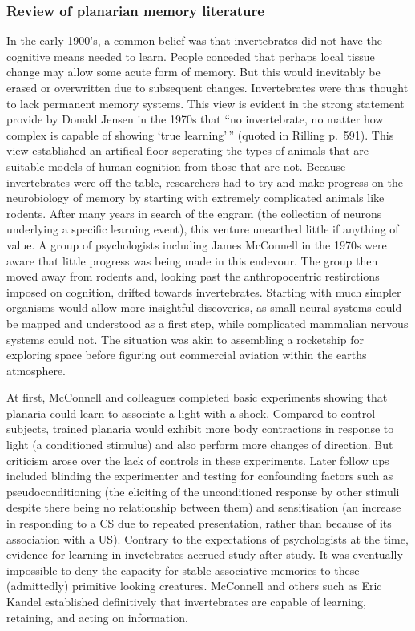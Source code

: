 \documentclass[
  letterpaper,
  DIV=11,
  numbers=noendperiod,
  oneside]{scrartcl}
\begin{document}
\subsubsection{Review of planarian memory
literature}\label{review-of-planarian-memory-literature}

In the early 1900's, a common belief was that invertebrates did not have
the cognitive means needed to learn. People conceded that perhaps local
tissue change may allow some acute form of memory. But this would
inevitably be erased or overwritten due to subsequent changes.
Invertebrates were thus thought to lack permanent memory systems. This
view is evident in the strong statement provide by Donald Jensen in the
1970s that ``no invertebrate, no matter how complex is capable of
showing `true learning'\,'' (quoted in Rilling p.~591). This view
established an artifical floor seperating the types of animals that are
suitable models of human cognition from those that are not. Because
invertebrates were off the table, researchers had to try and make
progress on the neurobiology of memory by starting with extremely
complicated animals like rodents. After many years in search of the
engram (the collection of neurons underlying a specific learning event),
this venture unearthed little if anything of value. A group of
psychologists including James McConnell in the 1970s were aware that
little progress was being made in this endevour. The group then moved
away from rodents and, looking past the anthropocentric restirctions
imposed on cognition, drifted towards invertebrates. Starting with much
simpler organisms would allow more insightful discoveries, as small
neural systems could be mapped and understood as a first step, while
complicated mammalian nervous systems could not. The situation was akin
to assembling a rocketship for exploring space before figuring out
commercial aviation within the earths atmosphere.

At first, McConnell and colleagues completed basic experiments showing
that planaria could learn to associate a light with a shock. Compared to
control subjects, trained planaria would exhibit more body contractions
in response to light (a conditioned stimulus) and also perform more
changes of direction. But criticism arose over the lack of controls in
these experiments. Later follow ups included blinding the experimenter
and testing for confounding factors such as pseudoconditioning (the
eliciting of the unconditioned response by other stimuli despite there
being no relationship between them) and sensitisation (an increase in
responding to a CS due to repeated presentation, rather than because of
its association with a US). Contrary to the expectations of
psychologists at the time, evidence for learning in invetebrates accrued
study after study. It was eventually impossible to deny the capacity for
stable associative memories to these (admittedly) primitive looking
creatures. McConnell and others such as Eric Kandel established
definitively that invertebrates are capable of learning, retaining, and
acting on information.
\end{document}
